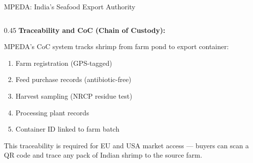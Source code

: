 \documentclass[
  ignorenonframetext,
  aspectratio=169,
]{beamer}
\providecommand{\tightlist}{%
  \setlength{\itemsep}{0pt}\setlength{\parskip}{0pt}}
\begin{document}
\begin{frame}{MPEDA: India's Seafood Export Authority}
\begin{columns}[T]
\begin{column}{0.45\linewidth}
\textbf{Traceability and CoC (Chain of Custody):}

MPEDA's CoC system tracks shrimp from farm pond to export container:

\begin{enumerate}
\tightlist
\item
  Farm registration (GPS-tagged)
\item
  Feed purchase records (antibiotic-free)
\item
  Harvest sampling (NRCP residue test)
\item
  Processing plant records
\item
  Container ID linked to farm batch
\end{enumerate}

This traceability is required for EU and USA market access --- buyers
can scan a QR code and trace any pack of Indian shrimp to the source
farm.
\end{column}
\end{columns}
\end{frame}
\end{document}

